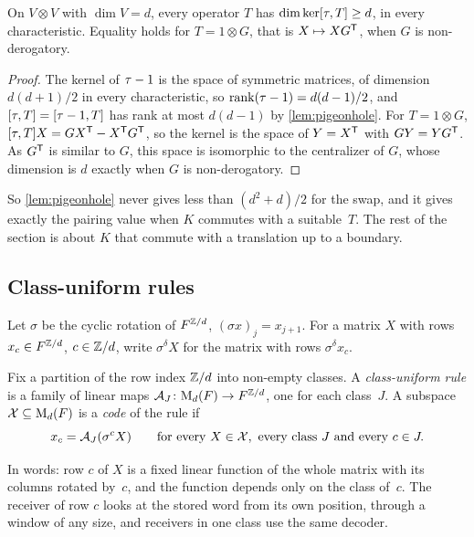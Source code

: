 \begin{proposition}\label{prop:swap-floor}
On $V\otimes V$ with $\dim V=d$, every operator $T$ has $\dim\ker[\tau,T]\ge d$, in every characteristic. Equality holds
for $T=1\otimes G$, that is $X\mapsto XG^{\mathsf{T}}$, when $G$ is non-derogatory.
\end{proposition}

\begin{proof}
The kernel of $\tau-1$ is the space of symmetric matrices, of dimension $d(d+1)/2$ in every characteristic, so
$\operatorname{rank}(\tau-1)=d(d-1)/2$, and $[\tau,T]=[\tau-1,T]$ has rank at most $d(d-1)$ by \cref{lem:pigeonhole}. For $T=1\otimes G$,
$[\tau,T]X=GX^{\mathsf{T}}-X^{\mathsf{T}}G^{\mathsf{T}}$, so the kernel is the space of $Y=X^{\mathsf{T}}$ with $GY=YG^{\mathsf{T}}$. As $G^{\mathsf{T}}$ is
similar to $G$, this space is isomorphic to the centralizer of $G$, whose dimension is $d$ exactly when $G$ is
non-derogatory.
\end{proof}

So \cref{lem:pigeonhole} never gives less than $(d^2+d)/2$ for the swap, and it gives exactly the pairing value when
$K$ commutes with a suitable~$T$. The rest of the section is about $K$ that commute with a translation up to a
boundary.

\subsection{Class-uniform rules}

Let $\sigma$ be the cyclic rotation of $F^{\mathbb{Z}/d}$, $(\sigma x)_j=x_{j+1}$. For a matrix $X$ with rows
$x_c\in F^{\mathbb{Z}/d}$, $c\in\mathbb{Z}/d$, write $\sigma^\delta X$ for the matrix with rows $\sigma^\delta x_c$.

\begin{definition}\label{def:class-uniform}
Fix a partition of the row index $\mathbb{Z}/d$ into non-empty classes. A \emph{class-uniform rule} is a family of linear maps
$\mathcal{A}_J\colon\mathrm{M}_d(F)\to F^{\mathbb{Z}/d}$, one for each class~$J$. A subspace $\mathcal{X}\subseteq\mathrm{M}_d(F)$ is a \emph{code} of the
rule if
\[
  x_c=\mathcal{A}_J(\sigma^cX)\qquad\text{for every }X\in\mathcal{X},\text{ every class }J\text{ and every }c\in J .
\]
\end{definition}

In words: row $c$ of $X$ is a fixed linear function of the whole matrix with its columns rotated by~$c$, and the function
depends only on the class of~$c$. The receiver of row $c$ looks at the stored word from its own position, through a
window of any size, and receivers in one class use the same decoder.

